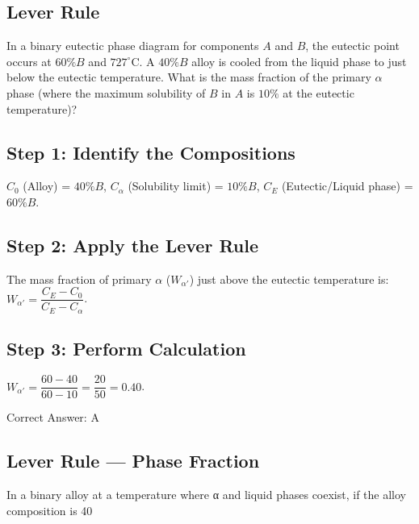 \clearpage

\subsection{Lever Rule}

In a binary eutectic phase diagram for components $A$ and $B$, the eutectic point occurs at $60\% B$ and $727^\circ\text{C}$. A $40\% B$ alloy is cooled from the liquid phase to just below the eutectic temperature. What is the mass fraction of the primary $\alpha$ phase (where the maximum solubility of $B$ in $A$ is $10\%$ at the eutectic temperature)?

\begin{choices}
\end{choices}

\begin{solution}

\subsection*{Step 1: Identify the Compositions}
$C_0$ (Alloy) = $40\% B$, $C_{\alpha}$ (Solubility limit) = $10\% B$, $C_E$ (Eutectic/Liquid phase) = $60\% B$.

\subsection*{Step 2: Apply the Lever Rule}
The mass fraction of primary $\alpha$ ($W_{\alpha'}$) just above the eutectic temperature is: $W_{\alpha'} = \dfrac{C_E - C_0}{C_E - C_{\alpha}}$.

\subsection*{Step 3: Perform Calculation}
$W_{\alpha'} = \dfrac{60 - 40}{60 - 10} = \dfrac{20}{50} = 0.40$.

Correct Answer: A
\end{solution}

\clearpage

\subsection{Lever Rule — Phase Fraction}

In a binary alloy at a temperature where α and liquid phases coexist, if the alloy composition is 40%

